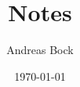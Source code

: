 \documentclass[11pt]{report}
\def\Author{Andreas Bock}
\begin{document}
\title{Notes}%
\author{\Author}
\date{\today}
\maketitle
\tableofcontents








%
%
%

\printbibliography
\end{document}
